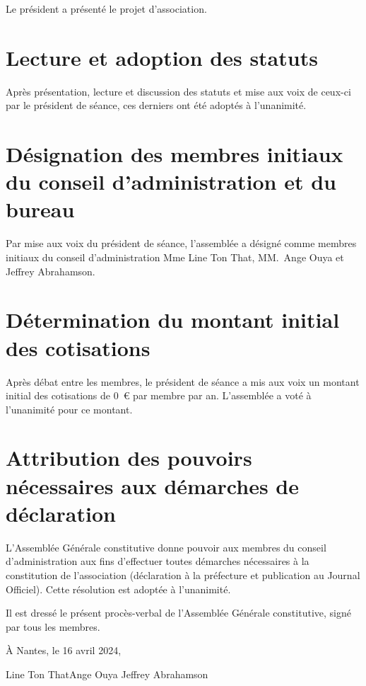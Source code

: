 \documentclass[12pt]{article}
\newcommand{\quand}{16 avril 2024}
\begin{document}
Le président a présenté le projet d'association.

\section{Lecture et adoption des statuts}
\label{sec:lecture-et-adoption-des-statuts}

Après présentation, lecture et discussion des statuts et mise aux voix
de ceux-ci par le président de séance, ces derniers ont été adoptés à
l'unanimité.

\section{Désignation des membres initiaux du conseil d'administration
  et du bureau}
\label{sec:designation-des-membres}

Par mise aux voix du président de séance, l'assemblée a désigné comme
membres initiaux du conseil d'administration Mme Line Ton That,
MM.~Ange Ouya et Jeffrey Abrahamson.

\section{Détermination du montant initial des cotisations}
\label{sec:determination-du-montant-initial-des-cotisations}

Après débat entre les membres, le président de séance a mis aux voix
un montant initial des cotisations de 0~\euro{} par membre par
an. L'assemblée a voté à l'unanimité pour ce montant.

\section{Attribution des pouvoirs nécessaires aux démarches de déclaration}
\label{sec:attribution-des-pouvoirs-necessaires-aux-demarches-de-declaration}

L'Assemblée Générale constitutive donne pouvoir aux membres du conseil
d'administration aux fins d'effectuer toutes démarches nécessaires à
la constitution de l'association (déclaration à la préfecture et
publication au Journal Officiel). Cette résolution est adoptée à
l'unanimité.

\vfill{}

Il est dressé le présent procès-verbal de l'Assemblée Générale
constitutive, signé par tous les membres.

\vspace{2cm}

\begin{flushright}
  À Nantes, le \quand{},
\end{flushright}

\vspace{2cm}

\hfile{}Line Ton That\hfill{}Ange Ouya \hspace{4cm} Jeffrey Abrahamson\hfill{}

\vfill
\end{document}
